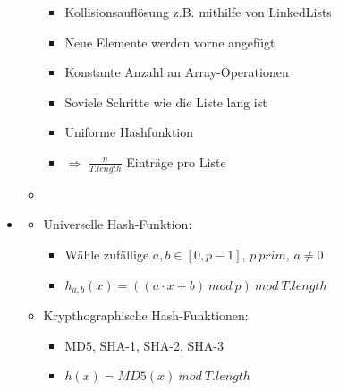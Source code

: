 \documentclass[
    12pt,
    a4paper,
    ngerman,
    color=3b,%
    marginpar=false,
    colorback=false,
    leqno,
]{tudaexercise}
\begin{document}
\begin{itemize}
\begin{itemize}
\begin{minipage}{0.4\textwidth}
                    \end{minipage}
                    \begin{minipage}{0.5\textwidth}
                        \begin{itemize}
                            \item Kollisionsauflösung z.B. mithilfe von LinkedLists
                            \item Neue Elemente werden vorne angefügt
                            \item Konstante Anzahl an Array-Operationen
                            \item Soviele Schritte wie die Liste lang ist 
                            \item Uniforme Hashfunktion
                            \item[] $\Rightarrow$ $\frac{n}{T.length}$ Einträge pro Liste
                        \end{itemize}
                    \end{minipage}
                \item[]
            \end{itemize}

        \item {}
            \begin{itemize}
                \item Universelle Hash-Funktion:
                    \begin{itemize}
                        \item Wähle zufällige $a,b \in [0, p - 1]$, $p~prim$, $a \neq 0$
                        \item $h_{a,b}(x)= ((a \cdot x + b)~mod~p)~mod~T.length$
                    \end{itemize}
                \item Krypthographische Hash-Funktionen:
                    \begin{itemize}
                        \item MD5, SHA-1, SHA-2, SHA-3
                        \item $h(x) = MD5(x)~mod~T.length$
                    \end{itemize}
            \end{itemize}

\pagebreak
        

\end{itemize}
\end{document}
